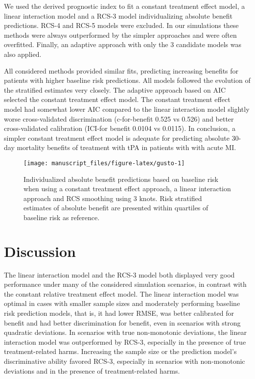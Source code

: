 \documentclass[]{elsarticle} %
\begin{document}
We used the derived prognostic index to fit a constant treatment effect
model, a linear interaction model and a RCS-3 model individualizing
absolute benefit predictions. RCS-4 and RCS-5 models were excluded. In
our simulations these methods were always outperformed by the simpler
approaches and were often overfitted. Finally, an adaptive approach with
only the 3 candidate models was also applied.

All considered methods provided similar fits, predicting increasing
benefits for patients with higher baseline risk predictions. All models
followed the evolution of the stratified estimates very closely. The
adaptive approach based on AIC selected the constant treatment effect
model. The constant treatment effect model had somewhat lower AIC
compared to the linear interaction model slightly worse cross-validated
discrimination (c-for-benefit 0.525 vs 0.526) and better cross-validated
calibration (ICI-for benefit 0.0104 vs 0.0115). In conclusion, a simpler
constant treatment effect model is adequate for predicting absolute
30-day mortality benefits of treatment with tPA in patients with with
acute MI.

\begin{figure}
\texttt{[image: manuscript\_files/figure-latex/gusto-1]} \caption{Individualized absolute benefit predictions based on baseline risk when using a constant treatment effect approach, a linear interaction approach and RCS smoothing using 3 knots. Risk stratified estimates of absolute benefit are presented within quartiles of baseline risk as reference.}\label{fig:gusto}
\end{figure}

\hypertarget{discussion}{%
\section{Discussion}\label{discussion}}

The linear interaction model and the RCS-3 model both displayed very
good performance under many of the considered simulation scenarios, in
contrast with the constant relative treatment effect model. The linear
interaction model was optimal in cases with smaller sample sizes and
moderately performing baseline risk prediction models, that is, it had
lower RMSE, was better calibrated for benefit and had better
discrimination for benefit, even in scenarios with strong quadratic
deviations. In scenarios with true non-monotonic deviations, the linear
interaction model was outperformed by RCS-3, especially in the presence
of true treatment-related harms. Increasing the sample size or the
prediction model's discriminative ability favored RCS-3, especially in
scenarios with non-monotonic deviations and in the presence of
treatment-related harms.
\end{document}
